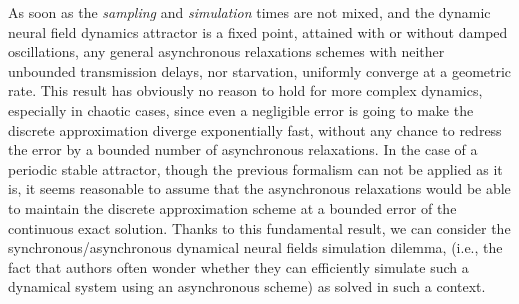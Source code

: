 As soon as the {\em sampling} and {\em simulation} times are not mixed, and the dynamic neural field dynamics attractor is a fixed point, attained with or without damped oscillations, any general asynchronous relaxations schemes with neither unbounded transmission delays, nor starvation, uniformly converge at a geometric rate. This result has obviously no reason to hold for more complex dynamics, especially in chaotic cases, since even a negligible error is going to make the discrete approximation diverge exponentially fast, without any chance to redress the error by a bounded number of asynchronous relaxations.  In the case of a periodic stable attractor, though the previous formalism can not be applied as it is, it seems reasonable to assume that the asynchronous relaxations would be able to maintain the discrete approximation scheme at a bounded error of the continuous exact solution. Thanks to this fundamental result, we can consider the synchronous/asynchronous dynamical neural fields simulation dilemma, (i.e., the fact that authors often wonder whether they can efficiently simulate such a dynamical system using an asynchronous scheme) as solved in such a context.
